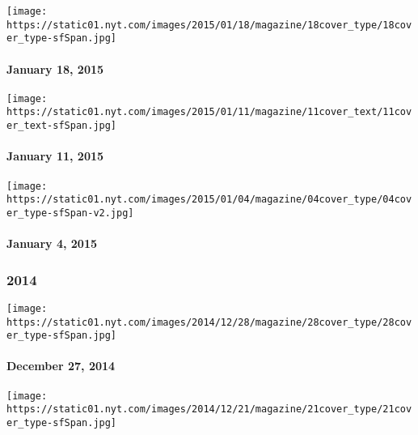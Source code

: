 \href{http://www.nytimes.com/indexes/2015/01/18/magazine/index.html}{}

\texttt{[image: https://static01.nyt.com/images/2015/01/18/magazine/18cover\_type/18cover\_type-sfSpan.jpg]}

\hypertarget{january-18-2015}{%
\paragraph{January 18, 2015}\label{january-18-2015}}

\href{http://www.nytimes.com/indexes/2015/01/11/magazine/index.html}{}

\texttt{[image: https://static01.nyt.com/images/2015/01/11/magazine/11cover\_text/11cover\_text-sfSpan.jpg]}

\hypertarget{january-11-2015}{%
\paragraph{January 11, 2015}\label{january-11-2015}}

\href{http://www.nytimes.com/indexes/2015/01/04/magazine/index.html}{}

\texttt{[image: https://static01.nyt.com/images/2015/01/04/magazine/04cover\_type/04cover\_type-sfSpan-v2.jpg]}

\hypertarget{january-4-2015}{%
\paragraph{January 4, 2015}\label{january-4-2015}}

\hypertarget{2014}{%
\subsubsection{2014}\label{2014}}

\href{http://www.nytimes.com/indexes/2014/12/27/magazine/index.html}{}

\texttt{[image: https://static01.nyt.com/images/2014/12/28/magazine/28cover\_type/28cover\_type-sfSpan.jpg]}

\hypertarget{december-27-2014}{%
\paragraph{December 27, 2014}\label{december-27-2014}}

\href{http://www.nytimes.com/indexes/2014/12/21/magazine/index.html}{}

\texttt{[image: https://static01.nyt.com/images/2014/12/21/magazine/21cover\_type/21cover\_type-sfSpan.jpg]}

